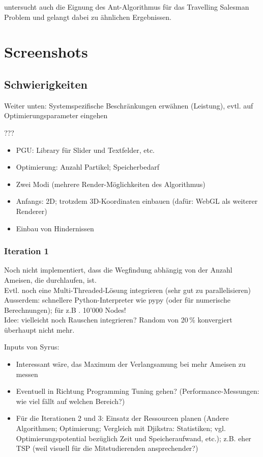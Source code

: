 \citeauthor*{leo-perf} untersucht auch die Eignung des Ant-Algorithmus für das Travelling Salesman Problem und gelangt dabei zu ähnlichen Ergebnissen.

\section{Screenshots}

\subsection{Schwierigkeiten}

Weiter unten: Systemspezifische Beschränkungen erwähnen (Leistung), evtl. auf Optimierungsparameter eingehen

???
\begin{itemize}[noitemsep]
\item PGU: Library für Slider und Textfelder, etc.
\item Optimierung: Anzahl Partikel; Speicherbedarf
\item Zwei Modi (mehrere Render-Möglichkeiten des Algorithmus)
\item Anfangs: 2D; trotzdem 3D-Koordinaten einbauen (dafür: WebGL als weiterer Renderer)
\item Einbau von Hindernissen
\end{itemize}

\subsubsection*{Iteration 1}

Noch nicht implementiert, dass die Wegfindung abhängig von der Anzahl Ameisen, die durchlaufen, ist. \\

Evtl. noch eine Multi-Threaded-Lösung integrieren (sehr gut zu parallelisieren) \\

Ausserdem: schnellere Python-Interpreter wie pypy (oder für numerische Berechnungen); für z.B . 10'000 Nodes! \\

Idee: vielleicht noch Rauschen integrieren? Random von 20\,\% konvergiert überhaupt nicht mehr.

\vspace*{3cm}


Inputs von Syrus: \\

\begin{itemize}
\item Interessant wäre, das Maximum der Verlangsamung bei mehr Ameisen zu messen
\item Eventuell in Richtung Programming Tuning gehen? (Performance-Messungen: wie viel fällt auf welchen Bereich?) 
\item Für die Iterationen 2 und 3: Einsatz der Ressourcen planen (Andere Algorithmen; Optimierung; Vergleich mit Djikstra: Statistiken; vgl. Optimierungspotential bezüglich Zeit und Speicheraufwand, etc.); z.B. eher TSP (weil visuell für die Mitstudierenden ansprechender?) 
\end{itemize}